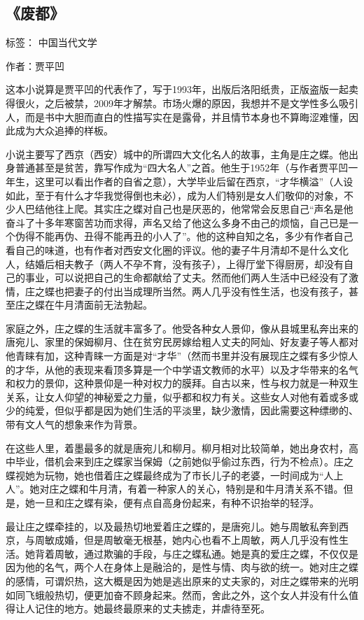 \subsection{《废都》}

标签： 中国当代文学


作者：贾平凹

这本小说算是贾平凹的代表作了，写于1993年，出版后洛阳纸贵，正版盗版一起卖得很火，之后被禁，2009年才解禁。市场火爆的原因，我想并不是文学性多么吸引人，而是书中大胆而直白的性描写实在是露骨，并且情节本身也不算晦涩难懂，因此成为大众追捧的样板。

小说主要写了西京（西安）城中的所谓四大文化名人的故事，主角是庄之蝶。他出身普通甚至是贫苦，靠写作成为“四大名人”之首。他生于1952年（与作者贾平凹一年生，这里可以看出作者的自省之意），大学毕业后留在西京，“才华横溢”（人设如此，至于有什么才华我觉得倒也未必），成为人们特别是女人们敬仰的对象，不少人巴结他往上爬。其实庄之蝶对自己也是厌恶的，他常常会反思自己“声名是他奋斗了十多年寒窗苦功而求得，声名又给了他这么多身不由己的烦恼，自己已是一个伪得不能再伪、丑得不能再丑的小人了”。他的这种自知之名，多少有作者自己看自己的味道，也有作者对西安文化圈的评议。他的妻子牛月清却不是什么文化人，结婚后相夫教子（两人不孕不育，没有孩子），上得厅堂下得厨房，却没有自己的事业，可以说把自己的生命都献给了丈夫。然而他们两人生活中已经没有了激情，庄之蝶也把妻子的付出当成理所当然。两人几乎没有性生活，也没有孩子，甚至庄之蝶在牛月清面前无法勃起。

家庭之外，庄之蝶的生活就丰富多了。他受各种女人景仰，像从县城里私奔出来的唐宛儿、家里的保姆柳月、住在贫穷民房嫁给粗人丈夫的阿灿、好友妻子等人都对他青睐有加，这种青睐一方面是对“才华”（然而书里并没有展现庄之蝶有多少惊人的才华，从他的表现来看顶多算是一个中学语文教师的水平）以及才华带来的名气和权力的景仰，这种景仰是一种对权力的膜拜。自古以来，性与权力就是一种双生关系，让女人仰望的神秘爱之力量，似乎都和权力有关。这些女人对他有着或多或少的纯爱，但似乎都是因为她们生活的平淡里，缺少激情，因此需要这种缥缈的、带有文人气的想象来作为背景。

在这些人里，着墨最多的就是唐宛儿和柳月。柳月相对比较简单，她出身农村，高中毕业，借机会来到庄之蝶家当保姆（之前她似乎偷过东西，行为不检点）。庄之蝶视她为玩物，她也借着庄之蝶最终成为了市长儿子的老婆，一时间成为“人上人”。她对庄之蝶和牛月清，有着一种家人的关心，特别是和牛月清关系不错。但是，她一旦和庄之蝶有染，便有点自高身份起来，有种不识抬举的轻浮。

最让庄之蝶牵挂的，以及最热切地爱着庄之蝶的，是唐宛儿。她与周敏私奔到西京，与周敏成婚，但是周敏毫无根基，她内心也看不上周敏，两人几乎没有性生活。她背着周敏，通过欺骗的手段，与庄之蝶私通。她是真的爱庄之蝶，不仅仅是因为他的名气，两个人在身体上是融洽的，是性与情、肉与欲的统一。她对庄之蝶的感情，可谓炽热，这大概是因为她是逃出原来的丈夫家的，对庄之蝶带来的光明如同飞蛾般热切，便更加奋不顾身起来。然而，舍此之外，这个女人并没有什么值得让人记住的地方。她最终最原来的丈夫掳走，并虐待至死。

